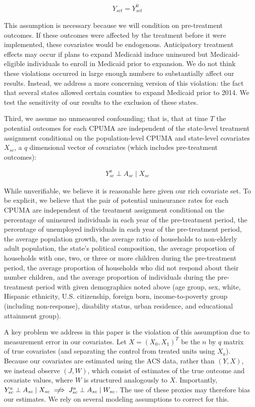 \begin{align*}
Y_{sct} = Y_{sct}^0
\end{align*}

This assumption is necessary because we will condition on pre-treatment outcomes. If these outcomes were affected by the treatment before it were implemented, these covariates would be endogenous. Anticipatory treatment effects may occur if plans to expand Medicaid induce uninsured but Medicaid-eligible individuals to enroll in Medicaid prior to expansion. We do not think these violations occurred in large enough numbers to substantially affect our results. Instead, we address a more concerning version of this violation: the fact that several states allowed certain counties to expand Medicaid prior to 2014. We test the sensitivity of our results to the exclusion of these states.

Third, we assume no unmeasured confounding; that is, that at time $T$ the potential outcomes for each CPUMA are independent of the state-level treatment assignment conditional on the population-level CPUMA and state-level covariates $X_{sc}$, a $q$ dimensional vector of covariates (which includes pre-treatment outcomes):

\begin{align*}
Y_{sc}^a \perp A_{sc} \mid X_{sc}
\end{align*}

While unverifiable, we believe it is reasonable here given our rich covariate set. To be explicit, we believe that the pair of potential uninsurance rates for each CPUMA are independent of the treatment assignment conditional on the percentage of uninsured individuals in each year of the pre-treatment period, the percentage of unemployed individuals in each year of the pre-treatment period, the average population growth, the average ratio of households to non-elderly adult population, the state's political composition, the average proportion of households with one, two, or three or more children during the pre-treatment period, the average proportion of households who did not respond about their number children, and the average proportion of individuals during the pre-treatment period with given demographics noted above (age group, sex, white, Hispanic ethnicity, U.S. citizenship, foreign born, income-to-poverty group (including non-response), disability status, urban residence, and educational attainment group). 

A key problem we address in this paper is the violation of this assumption due to measurement error in our covariates. Let 
$X = (X_0, X_1)^T$ be the $n$ by $q$ matrix of true covariates (and separating the control from treated units using $X_a$). Because our covariates are estimated using the ACS data, rather than $(Y, X)$, we instead observe $(J,W)$, which consist of estimates of the true outcome and covariate values, where $W$ is structured analogously to $X$. Importantly, $Y_{sc}^a \perp A_{sc} \mid X_{sc} \centernot\implies J_{sc}^a \perp A_{sc} \mid W_{sc}$. The use of these proxies may therefore bias our estimates. We rely on several modeling assumptions to correct for this.

